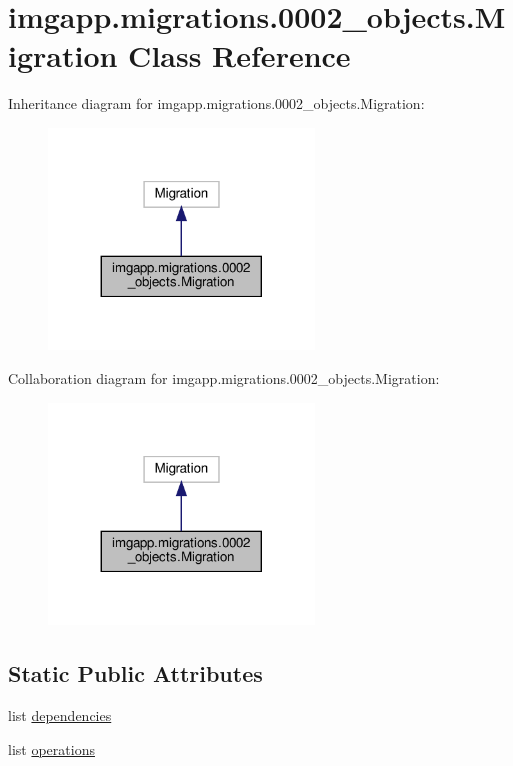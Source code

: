 \hypertarget{classimgapp_1_1migrations_1_10002__objects_1_1Migration}{}\section{imgapp.\+migrations.0002\+\_\+objects.Migration Class Reference}
\label{classimgapp_1_1migrations_1_10002__objects_1_1Migration}


Inheritance diagram for imgapp.\+migrations.0002\+\_\+objects.Migration\+:
\nopagebreak
\begin{figure}[H]
\begin{center}
\leavevmode
\includegraphics[width=200pt]{classimgapp_1_1migrations_1_10002__objects_1_1Migration__inherit__graph}
\end{center}
\end{figure}


Collaboration diagram for imgapp.\+migrations.0002\+\_\+objects.Migration\+:
\nopagebreak
\begin{figure}[H]
\begin{center}
\leavevmode
\includegraphics[width=200pt]{classimgapp_1_1migrations_1_10002__objects_1_1Migration__coll__graph}
\end{center}
\end{figure}
\subsection*{Static Public Attributes}
\begin{DoxyCompactItemize}
\item 
list \hyperlink{classimgapp_1_1migrations_1_10002__objects_1_1Migration_abd3fa170eb3a3149ee43f9acf33917b4}{dependencies}
\item 
list \hyperlink{classimgapp_1_1migrations_1_10002__objects_1_1Migration_adcbef6b10dcf430fa1e7ce7f4a9b700a}{operations}
\end{DoxyCompactItemize}


